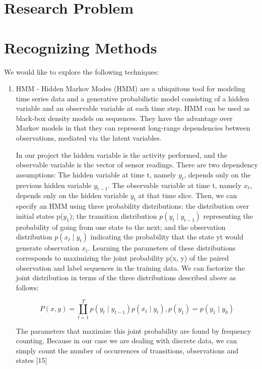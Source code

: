 \documentclass[11pt, oneside]{article}   	%
\begin{document}
\section{Research Problem}

\section{Recognizing Methods}
We would like to explore the following techniques:
	\begin{enumerate}
\item HMM - 
Hidden Markov Modes (HMM) are a ubiquitous tool for modeling time series data and a generative probabilistic model consisting of a hidden variable and an observable variable at each time step. HMM can be used as black-box density models on sequences. They have the advantage over Markov models in that they can represent long-range dependencies between observations, mediated via the latent variables. 

In our project the hidden variable is the activity performed, and the observable variable is the vector of sensor readings. There are two dependency assumptions: The hidden variable at time t, namely $y_{t}$, depends only on the previous hidden variable $y_{t-1}$. The observable variable at time t, namely $x_{t}$, depends only on the hidden variable $y_{t}$ at that time slice. Then, we can specify an HMM using three probability distributions: the distribution over initial states p($y_{1}$); the transition distribution $p(y_{t}\mid y_{t-1})$ representing the probability of going from one state to the next; and the observation distribution $p(x_{t}\mid y_{t})$ indicating the probability that the state yt would generate observation $x_{t}$.
Learning the parameters of these distributions corresponds to maximizing the joint probability p(x, y) of the paired observation and label sequences in the training data. We can factorize the joint distribution in terms of the three distributions described above as follows:

\begin{equation}
P(x,y)=\coprod_{t=1}^{T}p(y_{t}\mid y_{t-1})p(x_{t}\mid y_{t}), p(y_{1}) = p(y_{1}\mid y_{0})
\end{equation}

The parameters that maximize this joint probability are found by frequency counting. Because in our case we are dealing with discrete data, we can simply count the number of occurrences of transitions, observations and states [15]


\end{enumerate}
\end{document}
